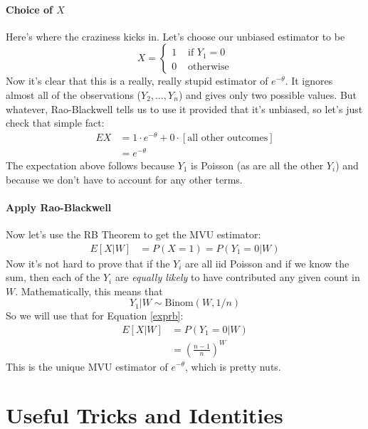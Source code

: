 \documentclass[a4paper,12pt]{scrartcl}
\begin{document}
\paragraph{Choice of $X$} Here's where the craziness kicks in. Let's
choose our unbiased estimator to be
   \[ X=\begin{cases} 1 & \text{ if $Y_1 = 0$} \\ 0 &\text{ otherwise}
      \end{cases} \]
Now it's clear that this is a really, really stupid estimator of
$e^{-\theta}$.  It ignores almost all of the observations
($Y_2, \ldots, Y_n$) and gives only two possible values. But whatever,
Rao-Blackwell tells us to use it provided that it's unbiased, so
let's just check that simple fact:
\begin{align*}
   EX &= 1 \cdot e^{-\theta} + 0 \cdot [\text{all other outcomes}] \\
   &=e^{-\theta}
\end{align*}
The expectation above follows because $Y_1$ is Poisson (as are all the
other $Y_i$) and because we don't have to account for any other terms.

\paragraph{Apply Rao-Blackwell} Now let's use the RB Theorem to get
the MVU estimator:
\begin{align}
   \label{exprb}
   E[X|W] &= P(X=1) = P(Y_1 = 0 | W)
\end{align}
Now it's not hard to prove that if the $Y_i$ are all iid Poisson
and if we know the sum, then each of the $Y_i$ are \emph{equally
likely} to have contributed any given count in $W$. Mathematically,
this means that
   \[ Y_1 | W \sim \text{Binom}(W, 1/n) \]
So we will use that for Equation \ref{exprb}:
\begin{align*}
   E[X|W] &= P(Y_1 = 0 | W) \\
   &= \left(\frac{n-1}{n}\right)^W
\end{align*}
This is the unique MVU estimator of $e^{-\theta}$, which is pretty nuts.

\newpage
\section{Useful Tricks and Identities}
\end{document}
